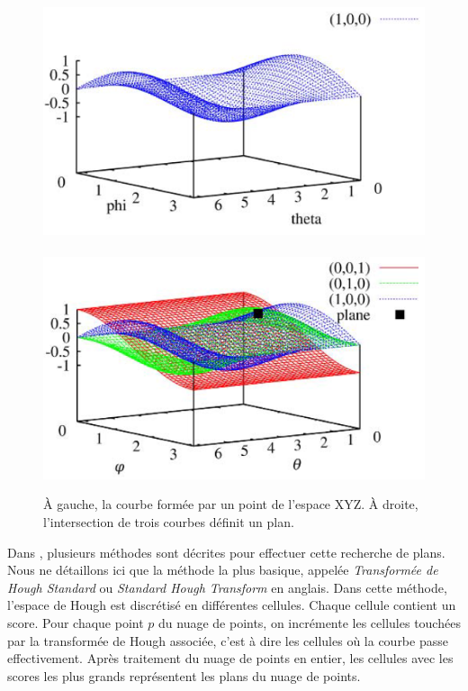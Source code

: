 \documentclass[12pt, twoside]{article}
\begin{document}
\begin{figure}[h]
\centering
\includegraphics[scale=0.5]{HoughCurv1.png}~\includegraphics[scale=0.5]{HoughCurv0.png}
\caption{\label{fig:Hough2} À gauche, la courbe formée par un point de l’espace XYZ. À droite, l’intersection de trois courbes définit un plan.}
\end{figure}

Dans \cite{Hough1}, plusieurs méthodes sont décrites pour effectuer cette recherche de plans. Nous ne détaillons ici que la méthode la plus basique, appelée \textit{Transformée de Hough Standard} ou \textit{Standard Hough Transform} en anglais. Dans cette méthode, l'espace de Hough est discrétisé en différentes cellules. Chaque cellule contient un score. Pour chaque point $p$ du nuage de points, on incrémente les cellules touchées par la transformée de Hough associée, c'est à dire les cellules où la courbe passe effectivement. Après traitement du nuage de points en entier, les cellules avec les scores les plus grands représentent les plans du nuage de points.
\end{document}
